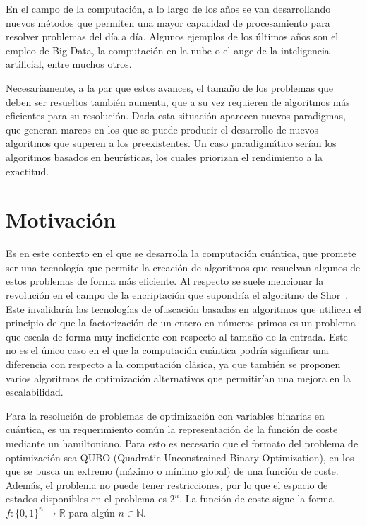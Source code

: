 En el campo de la computación, a lo largo de los años se van desarrollando nuevos métodos que permiten una mayor capacidad de procesamiento para resolver problemas del día a día.
Algunos ejemplos de los últimos años son el empleo de Big Data, la computación en la nube o el auge de la inteligencia artificial, entre muchos otros.

Necesariamente, a la par que estos avances, el tamaño de los problemas que deben ser resueltos también aumenta, que a su vez requieren de algoritmos más eficientes para su resolución.
Dada esta situación aparecen nuevos paradigmas, que generan marcos en los que se puede producir el desarrollo de nuevos algoritmos que superen a los preexistentes.
Un caso paradigmático serían los algoritmos basados en heurísticas, los cuales priorizan el rendimiento a la exactitud.

\section{Motivación}

Es en este contexto en el que se desarrolla la computación cuántica, que promete ser una tecnología que permite la creación de algoritmos que resuelvan algunos de estos problemas de forma más eficiente.
Al respecto se suele mencionar la revolución en el campo de la encriptación que supondría el algoritmo de Shor~\cite{Shor_algorithm}.
Este invalidaría las tecnologías de ofuscación basadas en algoritmos que utilicen el principio de que la factorización de un entero en números primos es un problema que escala de forma muy ineficiente con respecto al tamaño de la entrada.
Este no es el único caso en el que la computación cuántica podría significar una diferencia con respecto a la computación clásica,
ya que también se proponen varios algoritmos de optimización alternativos que permitirían una mejora en la escalabilidad.

Para la resolución de problemas de optimización con variables binarias en cuántica, es un requerimiento común la representación de la función de coste mediante un hamiltoniano.
Para esto es necesario que el formato del problema de optimización sea QUBO (Quadratic Unconstrained Binary Optimization), en los que se busca un extremo (máximo o mínimo global) de una función de coste.
Además, el problema no puede tener restricciones, por lo que el espacio de estados disponibles en el problema es $2^n$.
La función de coste sigue la forma $f: {\{0, 1\}}^n \rightarrow \mathbb{R}$ para algún $n \in \mathbb{N}$.

